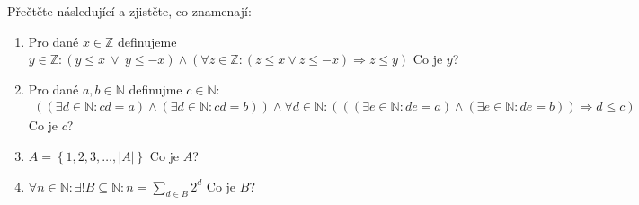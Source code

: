 Přečtěte následující a zjistěte, co znamenají:
\begin{enumerate}

	\item  Pro dané $x \in \mathbb{Z}$ definujeme
		$y \in \mathbb{Z}\colon
		(y \leq x \  \vee \  y \leq -x) \wedge
		\left( \forall z \in \mathbb{Z}\colon (z \leq x \vee z \leq -x) \Rightarrow z \leq y \right)
		$
		Co je $y$?


	\item  Pro dané $a, b \in \mathbb{N}$ definujme $c \in \mathbb{N}$:
		\begin{align*}
			((\exists d \in \mathbb{N}\colon cd = a) \wedge (\exists d \in \mathbb{N}\colon cd = b)) \wedge
			\forall d \in \mathbb{N}\colon \left(
			((\exists e \in \mathbb{N}\colon de = a) \wedge (\exists e \in \mathbb{N}\colon de = b))
			\Rightarrow d \leq c \right)
		\end{align*}
		Co je $c$?


	\item  $A = \left\{ 1, 2, 3, \ldots, |A| \right\}$ Co je $A$?


	\item  $\forall n \in \mathbb{N}\colon \exists! B \subseteq \mathbb{N}\colon n = \sum_{d \in B} 2^d$
		Co je $B$?


\end{enumerate}

